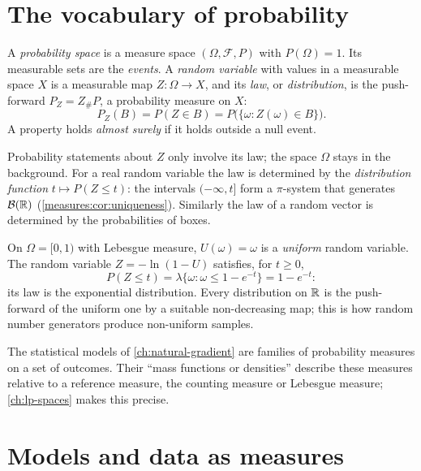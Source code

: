 \begin{notechapter}
\section{The vocabulary of probability}\label{measures:sec:probability}

\begin{definition}\label{measures:def:probability}
A \emph{probability space} is a measure space $(\Omega, \mathcal F, P)$
with $P(\Omega) = 1$. Its measurable sets are the \emph{events}. A
\emph{random variable} with values in a measurable space $X$ is a
measurable map $Z:\Omega\to X$, and its \emph{law}, or
\emph{distribution}, is the push-forward $P_Z = Z_\#P$, a probability
measure on $X$:
\[
  P_Z(B) = P(Z\in B) = P\bigl(\{\omega : Z(\omega)\in B\}\bigr) .
\]
A property holds \emph{almost surely} if it holds outside a null event.
\end{definition}

Probability statements about $Z$ only involve its law; the space
$\Omega$ stays in the background. For a real random variable the law is
determined by the \emph{distribution function}
$t\mapsto P(Z\leq t)$: the intervals $(-\infty, t]$ form a $\pi$-system
that generates $\mathcal B(\mathbb{R})$ (\cref{measures:cor:uniqueness}).
Similarly the law of a random vector is determined by the probabilities
of boxes.

\begin{example}\label{measures:ex:inverse}
On $\Omega = [0, 1)$ with Lebesgue measure, $U(\omega) = \omega$ is a
\emph{uniform} random variable. The random variable
$Z = -\ln(1 - U)$ satisfies, for $t\geq0$,
\[
  P(Z\leq t) = \lambda\{\omega : \omega\leq1 - e^{-t}\} = 1 - e^{-t} :
\]
its law is the exponential distribution. Every distribution on $\mathbb{R}$ is
the push-forward of the uniform one by a suitable non-decreasing map;
this is how random number generators produce non-uniform samples.
\end{example}

The statistical models of \cref{ch:natural-gradient} are families of
probability measures on a set of outcomes. Their ``mass functions or
densities'' describe these measures relative to a reference measure, the
counting measure or Lebesgue measure; \cref{ch:lp-spaces} makes this
precise.

\section{Models and data as measures}\label{measures:sec:ml}


\end{notechapter}
